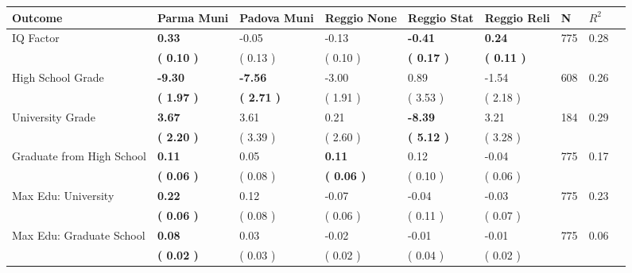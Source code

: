 \begin{tabular}{L{6.2cm} C{1.8cm} C{1.8cm} C{1.8cm} C{1.8cm} C{1.8cm} C{1.8cm} C{0.3cm} C{0.3cm}}
\toprule
 \textbf{Outcome} & \textbf{Parma Muni} & \textbf{Padova Muni} & \textbf{Reggio None} & \textbf{Reggio Stat} & \textbf{Reggio Reli} & \textbf{N} & \textbf{$ R^2$} \\
\midrule
IQ Factor & \textbf{     0.33} &     -0.05 &     -0.13 & \textbf{    -0.41} & \textbf{     0.24}  & 775 &       0.28 \\ 
 & \textbf{(     0.10 )} & (     0.13 ) & (     0.10 ) & \textbf{(     0.17 )} & \textbf{(     0.11 )}  & \\
High School Grade & \textbf{    -9.30} & \textbf{    -7.56} &     -3.00 &      0.89 &     -1.54  & 608 &       0.26 \\ 
 & \textbf{(     1.97 )} & \textbf{(     2.71 )} & (     1.91 ) & (     3.53 ) & (     2.18 )  & \\
University Grade & \textbf{     3.67} &      3.61 &      0.21 & \textbf{    -8.39} &      3.21  & 184 &       0.29 \\ 
 & \textbf{(     2.20 )} & (     3.39 ) & (     2.60 ) & \textbf{(     5.12 )} & (     3.28 )  & \\
Graduate from High School & \textbf{     0.11} &      0.05 & \textbf{     0.11} &      0.12 &     -0.04  & 775 &       0.17 \\ 
 & \textbf{(     0.06 )} & (     0.08 ) & \textbf{(     0.06 )} & (     0.10 ) & (     0.06 )  & \\
Max Edu: University & \textbf{     0.22} &      0.12 &     -0.07 &     -0.04 &     -0.03  & 775 &       0.23 \\ 
 & \textbf{(     0.06 )} & (     0.08 ) & (     0.06 ) & (     0.11 ) & (     0.07 )  & \\
Max Edu: Graduate School & \textbf{     0.08} &      0.03 &     -0.02 &     -0.01 &     -0.01  & 775 &       0.06 \\ 
 & \textbf{(     0.02 )} & (     0.03 ) & (     0.02 ) & (     0.04 ) & (     0.02 )  & \\
\bottomrule
\end{tabular}
